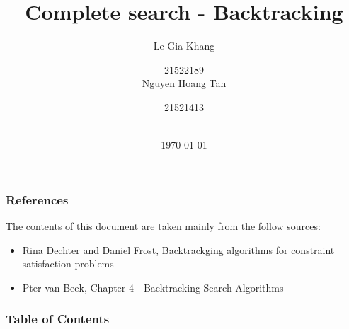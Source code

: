 \documentclass[
	11pt,
]{beamer}
\title[Design and Analysis of Algorithms]{Complete search - Backtracking} %
\author[Group 2]{
                    Le Gia Khang \and 21522189 \\
                    Nguyen Hoang Tan \and 21521413 \\} %
\institute[UIT]{\fontsize{10}{12}\selectfont \textbf{University of Information Technology} \\ \smallskip \textit{}} %
\date[\today]{ \\ \today} %
\begin{document}
\setcounter{tocdepth}{1}
\begin{frame}
	\titlepage %
\end{frame}



\begin{frame}
	\frametitle{References}
	The contents of this document are taken mainly from the follow sources:
	\begin{itemize}
		\item Rina Dechter and Daniel Frost, Backtrackging algorithms for constraint satisfaction problems 
		\item Pter van Beek, Chapter 4 - Backtracking Search Algorithms
	\end{itemize}

\end{frame}
\begin{frame}
	\frametitle{Table of Contents} %
	
	\tableofcontents %
\end{frame}
\end{document}
